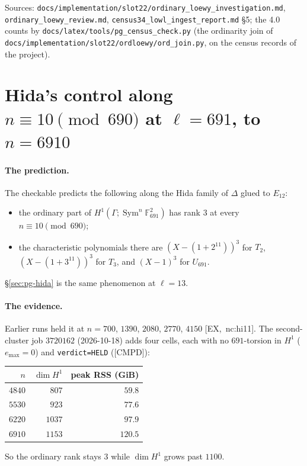\documentclass[11pt]{article}
\newcommand{\F}{\mathbb{F}}
\newcommand{\Sym}{\operatorname{Sym}}
\newcommand{\Ga}{\Gamma}
\newcommand{\code}[1]{\texttt{#1}}
\newcommand{\file}[1]{\texttt{#1}}
\newcommand{\pfile}[1]{\nolinkurl{#1}}
\newcommand{\CMPD}{\textsf{\small[CMPD]}}
\begin{document}
\noindent Sources: \pfile{docs/implementation/slot22/ordinary_loewy_investigation.md}, \pfile{ordinary_loewy_review.md},
\pfile{census34_lowl_ingest_report.md} \S5; the 4.0 counts by \file{docs/latex/tools/pg\_census\_check.py} (the ordinarity join of
\pfile{docs/implementation/slot22/ordloewy/ord_join.py}, on the census records of the project).

\section{Hida's control along \texorpdfstring{$n\equiv10\pmod{690}$}{n = 10 mod 690} at \texorpdfstring{$\ell=691$}{l=691}, to \texorpdfstring{$n=6910$}{n=6910}}\label{sec:pg-hi11}

\paragraph{The prediction.} The checkable {\ttfamily[C,~Hi11]} predicts the following along the Hida family of $\Delta$ glued to $E_{12}$:
\begin{itemize}[leftmargin=1.6em,itemsep=1pt]
\item the ordinary part of $H^{1}(\Ga;\Sym^{n}\F_{691}^{2})$ has rank $3$ at every $n\equiv10\pmod{690}$;
\item the characteristic polynomials there are $(X-(1+2^{11}))^{3}$ for $T_2$, $(X-(1+3^{11}))^{3}$ for $T_3$, and $(X-1)^{3}$ for
  $U_{691}$.
\end{itemize}
\S\ref{sec:pg-hida} is the same phenomenon at $\ell=13$.

\paragraph{The evidence.} Earlier runs held it at $n=700$, $1390$, $2080$, $2770$, $4150$ [EX,~nc:hi11]. The second-cluster job $3720162$
(2026-10-18) adds four cells, each with no $691$-torsion in $H^{1}$ ($e_{\max}=0$) and \code{verdict=HELD} (\CMPD):
\begin{center}\small
\begin{tabular}{@{}rrr@{}}
\toprule
$n$ & $\dim H^{1}$ & peak RSS (GiB) \\
\midrule
$4840$ & $807$ & $59.8$ \\
$5530$ & $923$ & $77.6$ \\
$6220$ & $1037$ & $97.9$ \\
$6910$ & $1153$ & $120.5$ \\
\bottomrule
\end{tabular}
\end{center}
So the ordinary rank stays $3$ while $\dim H^{1}$ grows past $1100$.
\end{document}
